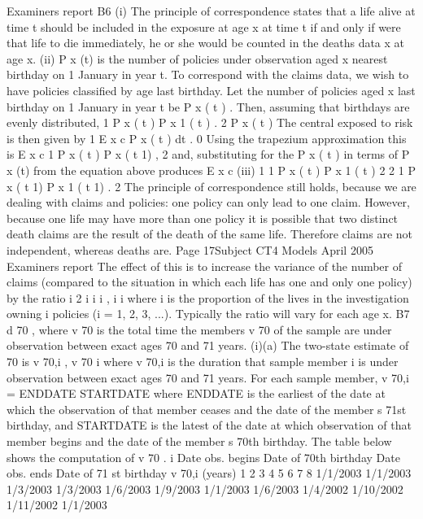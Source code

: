 \documentclass[a4paper,12pt]{article}
\begin{document}
\begin{enumerate}
Examiners report
B6 (i) The principle of correspondence states that a life alive at time t should be
included in the exposure at age x at time t if and only if were that life to die
immediately, he or she would be counted in the deaths data x at age x.
(ii) P x (t) is the number of policies under observation aged x nearest birthday on
1 January in year t.
To correspond with the claims data, we wish to have policies classified by age
last birthday.
Let the number of policies aged x last birthday on 1 January in year t be P x ( t ) .
Then, assuming that birthdays are evenly distributed,
1
P x ( t ) P x 1 ( t ) .
2
P x ( t )
The central exposed to risk is then given by
1
E x c
P x ( t ) dt .
0
Using the trapezium approximation this is
E x c
1
P x ( t ) P x ( t 1) ,
2
and, substituting for the P x ( t ) in terms of P x (t) from the equation above
produces
E x c
(iii)
1 1
P x ( t ) P x 1 ( t )
2 2
1
P x ( t 1) P x 1 ( t 1) .
2
The principle of correspondence still holds, because we are dealing with
claims and policies: one policy can only lead to one claim.
However, because one life may have more than one policy it is possible that
two distinct death claims are the result of the death of the same life.
Therefore claims are not independent, whereas deaths are.
Page 17Subject CT4
Models
April 2005
Examiners report
The effect of this is to increase the variance of the number of claims
(compared to the situation in which each life has one and only one policy) by
the ratio
i 2
i
i
i
,
i
i
where i is the proportion of the lives in the investigation owning i policies (i
= 1, 2, 3, ...).
Typically the ratio will vary for each age x.
B7
d 70
, where v 70 is the total time the members
v 70
of the sample are under observation between exact ages 70 and 71 years.
(i)(a) The two-state estimate of
70
is
v 70,i ,
v 70
i
where v 70,i is the duration that sample member i is under observation between
exact ages 70 and 71 years.
For each sample member, v 70,i = ENDDATE
STARTDATE
where ENDDATE is the earliest of the date at which the observation of that
member ceases and the date of the member s 71st birthday,
and STARTDATE is the latest of the date at which observation of that
member begins and the date of the member s 70th birthday.
The table below shows the computation of v 70 .
i Date
obs.
begins Date of
70th
birthday Date
obs.
ends Date of
71 st
birthday v 70,i
(years)
1
2
3
4
5
6
7
8 1/1/2003
1/1/2003
1/3/2003
1/3/2003
1/6/2003
1/9/2003
1/1/2003
1/6/2003 1/4/2002
1/10/2002
1/11/2002
1/1/2003

\end{enumerate}
\end{document}
